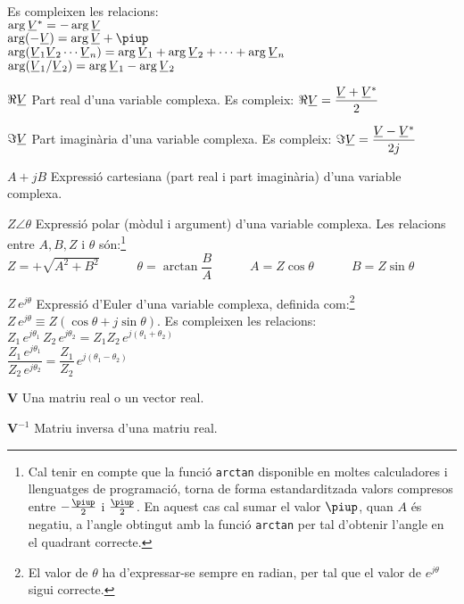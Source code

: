 \begin{list}{}
     Es compleixen les relacions:\\[1ex]
      $\arg\cmplx{V}^* = - \arg\cmplx{V}$\\[1ex]
      $\arg(-\cmplx{V}) =  \arg\cmplx{V} + \piup$\\[1ex]
      $\arg(\cmplx{V}_1 \cmplx{V}_2 \cdots \cmplx{V}_n) = \arg\cmplx{V}_1 + \arg \cmplx{V}_2 + \cdots + \arg\cmplx{V}_n$\\[1ex]
      $\arg(\cmplx{V}_1 / \cmplx{V}_2) = \arg\cmplx{V}_1 - \arg \cmplx{V}_2$
    \item[$\Re\cmplx{V}$] Part real d'una variable complexa. Es compleix: $\Re\cmplx{V} = \dfrac{\cmplx{V} + \cmplx{V}^*}{2}$
    \item[$\Im\cmplx{V}$] Part imaginària d'una variable complexa. Es compleix: $\Im\cmplx{V} = \dfrac{\cmplx{V} - \cmplx{V}^*}{2 j}$
    \item[$A+j B$] Expressió cartesiana (part real i part
    imaginària) d'una variable complexa.
    \item[$Z\angle\theta$] Expressió polar (mòdul i argument) d'una variable
    complexa. Les relacions entre $A, B, Z$ i $\theta$ són:\footnote{Cal tenir en compte que la funció \texttt{arctan} disponible en moltes calculadores i llenguatges de programació, torna de forma  estandarditzada valors compresos entre $-\frac{\piup}{2}$ i $\frac{\piup}{2}$. En aquest cas cal sumar el valor $\piup$, quan $A$ és negatiu, a l'angle obtingut amb la funció \texttt{arctan} per tal d'obtenir l'angle en el quadrant correcte.}\\[1ex]
    $Z=+\sqrt{A^2+B^2}\qquad\quad\theta=\arctan{\dfrac{B}{A}}\qquad\quad
    A=Z\cos\theta\qquad\quad B=Z\sin\theta$
    \item[$Z\,e^{j\theta}$] Expressió d'Euler d'una variable complexa, definida com:\footnote{El valor de $\theta$ ha d'expressar-se sempre en radian, per tal que el valor de $e^{j\theta}$ sigui correcte.}
     $Z\,e^{j\theta} \equiv Z(\cos\theta+j\sin\theta)$.
     Es compleixen les relacions:\\[1ex]
     $Z_1\,e^{j\theta_1} \, Z_2\,e^{j\theta_2} = Z_1 Z_2\,e^{j(\theta_1+\theta_2)}$\\[1ex]
     $\dfrac{Z_1\,e^{j\theta_1}}{Z_2\,e^{j\theta_2}} = \dfrac{Z_1}{Z_2}\,e^{j(\theta_1-\theta_2)}$
    \item[$\boldsymbol{V}$] Una matriu real o un vector real.
    \item[$\boldsymbol{V}^{-1}$] Matriu inversa d'una matriu real.

\end{list}
